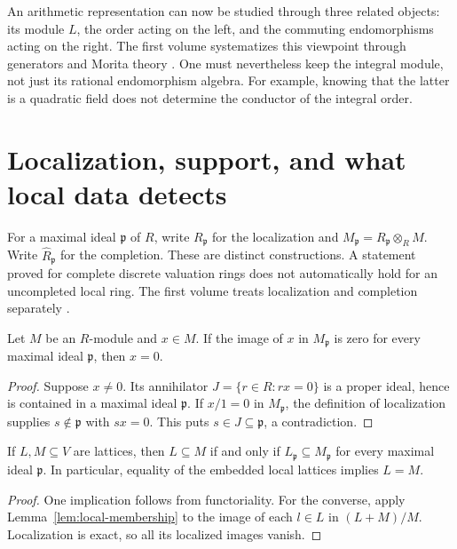 An arithmetic representation can now be studied through three
related objects: its module $L$, the order acting on the left, and
the commuting endomorphisms acting on the right. The first volume
systematizes this viewpoint through generators and Morita theory
\cite[Ch.~III]{RoggenkampHuberDyson1970}. One must nevertheless keep
the integral module, not just its rational endomorphism algebra.
For example, knowing that the latter is a quadratic field does not
determine the conductor of the integral order.

\section{Localization, support, and what local data detects}

For a maximal ideal $\mathfrak p$ of $R$, write
$R_{\mathfrak p}$ for the localization and
$M_{\mathfrak p}=R_{\mathfrak p}\otimes_R M$. Write
$\widehat R_{\mathfrak p}$ for the completion. These are distinct
constructions. A statement proved for complete discrete valuation
rings does not automatically hold for an uncompleted local ring.
The first volume treats localization and completion separately
\cite[Ch.~I, \S\S6--9]{RoggenkampHuberDyson1970}.

\begin{lemma}
\label{lem:local-membership}
Let $M$ be an $R$-module and $x\in M$. If the image of $x$ in
$M_{\mathfrak p}$ is zero for every maximal ideal $\mathfrak p$,
then $x=0$.
\end{lemma}

\begin{proof}
Suppose $x\ne0$. Its annihilator
$J=\{r\in R:rx=0\}$ is a proper ideal, hence is contained in
a maximal ideal $\mathfrak p$. If $x/1=0$ in
$M_{\mathfrak p}$, the definition of localization supplies
$s\notin\mathfrak p$ with $sx=0$. This puts $s\in J\subseteq
\mathfrak p$, a contradiction.
\end{proof}

\begin{proposition}
If $L,M\subseteq V$ are lattices, then $L\subseteq M$ if and
only if $L_{\mathfrak p}\subseteq M_{\mathfrak p}$ for every
maximal ideal $\mathfrak p$. In particular, equality of the
embedded local lattices implies $L=M$.
\end{proposition}

\begin{proof}
One implication follows from functoriality. For the converse,
apply Lemma~\ref{lem:local-membership} to the image of each
$l\in L$ in $(L+M)/M$. Localization is exact, so all its
localized images vanish.
\end{proof}

